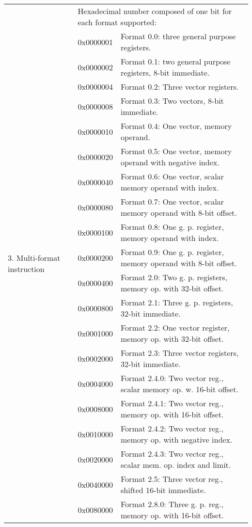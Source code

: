 \documentclass[forwardcom.tex]{subfiles}
\begin{document}
\begin{longtable} {|p{18mm}|p{14mm} p{80mm}|}
\multirow{27}{*}{\parbox[t]{18mm}{3. Multi-format instruction}} 
  &  \multicolumn{2}{|l|}{
     Hexadecimal number composed of one bit for each format supported:} \\
  &  0x0000001 & Format 0.0: three general purpose registers. \\
  &  0x0000002 & Format 0.1: two general purpose registers, 8-bit immediate. \\
  &  0x0000004 & Format 0.2: Three vector registers. \\
  &  0x0000008 & Format 0.3: Two vectors, 8-bit immediate. \\
  &  0x0000010 & Format 0.4: One vector, memory operand. \\
  &  0x0000020 & Format 0.5: One vector, memory operand with negative index. \\
  &  0x0000040 & Format 0.6: One vector, scalar memory operand with index. \\
  &  0x0000080 & Format 0.7: One vector, scalar memory operand with 8-bit offset. \\
  &  0x0000100 & Format 0.8: One g. p. register, memory operand with index. \\
  &  0x0000200 & Format 0.9: One g. p. register, memory operand with 8-bit offset. \\
  &  0x0000400 & Format 2.0: Two g. p. registers, memory op. with 32-bit offset. \\
  &  0x0000800 & Format 2.1: Three g. p. registers, 32-bit immediate. \\
  &  0x0001000 & Format 2.2: One vector register, memory op. with 32-bit offset. \\
  &  0x0002000 & Format 2.3: Three vector registers, 32-bit immediate. \\
  &  0x0004000 & Format 2.4.0: Two vector reg., scalar memory op. w. 16-bit offset. \\
  &  0x0008000 & Format 2.4.1: Two vector reg., memory op. with 16-bit offset. \\
  &  0x0010000 & Format 2.4.2: Two vector reg., memory op. with negative index. \\
  &  0x0020000 & Format 2.4.3: Two vector reg., scalar mem. op. index and limit. \\
  &  0x0040000 & Format 2.5: Three vector reg., shifted 16-bit immediate. \\
  &  0x0080000 & Format 2.8.0: Three g. p. reg., memory op. with 16-bit offset. \\

\end{longtable}
\end{document}
